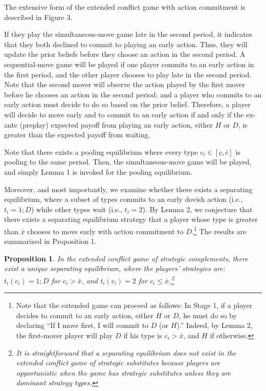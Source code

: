 \documentclass[12pt,english]{article}
\begin{document}
The extensive form of the extended conflict game with action commitment is described in Figure 3.\par 
If they play the simultaneous-move game late in the second period, it indicates that they both declined to commit to playing an early action. Thus, they will update the prior beliefs before they choose an action in the second period. A sequential-move game will be played if one player commits to an early action in the first period, and the other player chooses to play late in the second period. Note that the second mover will observe the action played by the first mover before he chooses an action in the second period; and a player who commits to an early action must decide to do so based on the prior belief. Therefore, a player will decide to move early and to commit to an early action if and only if the ex-ante (preplay) expected payoff from playing an early action, either $H$ or $D$, is greater than the expected payoff from waiting. \par 
Note that there exists a pooling equilibrium where every type $c_i \in [\underline{c}, \bar{c}]$ is pooling to the same period. Then, the simultaneous-move game will be played, and simply Lemma 1 is invoked for the pooling equilibrium. \par 
Moreover, and most importantly, we examine whether there exists a separating equilibrium, where a subset of types commits to an early dovish action (i.e., $t_i=1;D$) while other types wait (i.e., $t_i=2$). By Lemma 2, we conjecture that there exists a separating equilibrium strategy that a player whose type is greater than $\bar{x}$ chooses to move early with action commitment to $D$.\footnote{Note that the extended game can proceed as follows: In Stage 1, if a player decides to commit to an early action, either $H$ or $D$, he must do so by declaring ``If I move first, I will commit to $D$ (or $H$).'' Indeed, by Lemma 2, the first-mover player will play $D$ if his type is $c_i > \bar{x}$, and $H$ if otherwise.} The results are summarized in Proposition 1.\par
\newtheorem{prop}{Proposition}
\begin{prop}
In the extended conflict game of strategic complements, there exist a unique separating equilibrium, where the players' strategies are: $t_{i}(c_i)=1; D$ for $c_i >\bar{x}$, and $t_{i}(c_i)=2$ for $c_{i} \leq \bar{x}$.\footnote{It is straightforward that a separating equilibrium does not exist in the extended conflict game of strategic substitutes because players are opportunistic when the game has strategic substitutes unless they are dominant strategy types.}
\end{prop}\par
\end{document}
